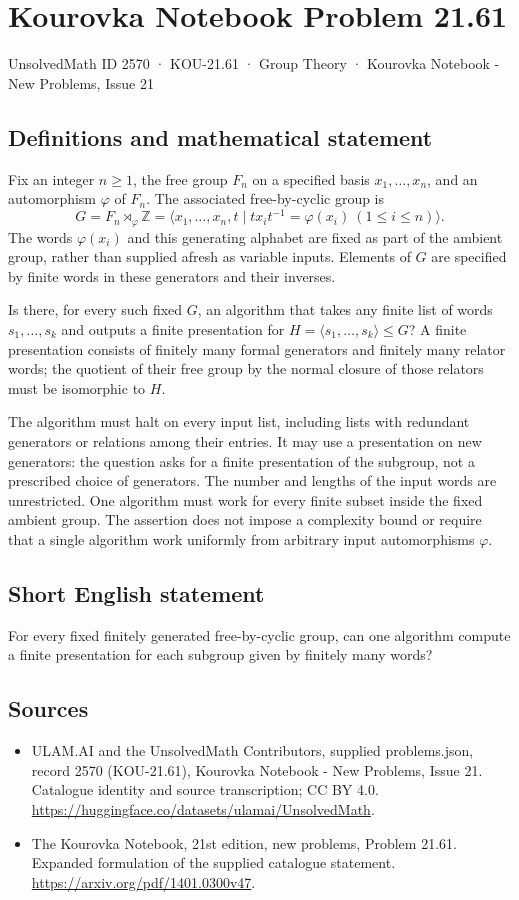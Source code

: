 \documentclass[11pt,a4paper]{article}
\begin{document}
\section*{Kourovka Notebook Problem 21.61}\label{2570}
{\small UnsolvedMath ID 2570 · KOU-21.61 · Group Theory · Kourovka Notebook - New Problems, Issue 21}
\subsection{Definitions and mathematical statement}
Fix an integer $n\ge1$, the free group $F_n$ on a specified basis
$x_1,\ldots,x_n$, and an automorphism $\varphi$ of $F_n$.
The associated free-by-cyclic group is
\[
 G=F_n\rtimes_\varphi\mathbb Z
   =\langle x_1,\ldots,x_n,t\mid
       tx_it^{-1}=\varphi(x_i)\ (1\le i\le n)\rangle.
\]
The words $\varphi(x_i)$ and this generating alphabet are fixed as
part of the ambient group, rather than supplied afresh as variable
inputs. Elements of $G$ are specified by finite words in these
generators and their inverses.

Is there, for every such fixed $G$, an algorithm that takes any finite
list of words $s_1,\ldots,s_k$ and outputs a finite presentation for
$H=\langle s_1,\ldots,s_k\rangle\le G$? A finite presentation consists
of finitely many formal generators and finitely many relator words;
the quotient of their free group by the normal closure of those
relators must be isomorphic to $H$.

The algorithm must halt on every input list, including lists with
redundant generators or relations among their entries. It may use a
presentation on new generators: the question asks for a finite
presentation of the subgroup, not a prescribed choice of generators.
The number and lengths of the input words are unrestricted.
One algorithm must work for every finite subset inside the fixed
ambient group. The assertion does not impose a complexity bound or
require that a single algorithm work uniformly from arbitrary input
automorphisms $\varphi$.
\subsection{Short English statement}
For every fixed finitely generated free-by-cyclic group, can one algorithm compute a finite presentation for each subgroup given by finitely many words?
\subsection{Sources}
\begin{itemize}
\item[S1] ULAM.AI and the UnsolvedMath Contributors, supplied problems.json, record 2570 (KOU-21.61), Kourovka Notebook - New Problems, Issue 21. Catalogue identity and source transcription; CC BY 4.0.
\url{https://huggingface.co/datasets/ulamai/UnsolvedMath}.
\item[S2] The Kourovka Notebook, 21st edition, new problems, Problem 21.61. Expanded formulation of the supplied catalogue statement.
\url{https://arxiv.org/pdf/1401.0300v47}.
\end{itemize}
\end{document}
